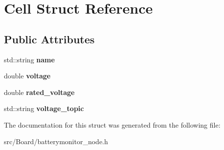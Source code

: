 \hypertarget{structCell}{}\section{Cell Struct Reference}
\label{structCell}
\subsection*{Public Attributes}
\begin{DoxyCompactItemize}
\item 
\mbox{\label{structCell_a6053c34c5856a431ffe11aa5593602e2}} 
std\+::string {\bfseries name}
\item 
\mbox{\label{structCell_a5f54f35bc4f4cfb54360e9b52382cc0d}} 
double {\bfseries voltage}
\item 
\mbox{\label{structCell_a846aaf212d6ecdc4233fbafc2f353750}} 
double {\bfseries rated\+\_\+voltage}
\item 
\mbox{\label{structCell_ae7369e3cd620d7d3b4eb23a1354864d1}} 
std\+::string {\bfseries voltage\+\_\+topic}
\end{DoxyCompactItemize}


The documentation for this struct was generated from the following file\+:\begin{DoxyCompactItemize}
\item 
src/\+Board/batterymonitor\+\_\+node.\+h\end{DoxyCompactItemize}
